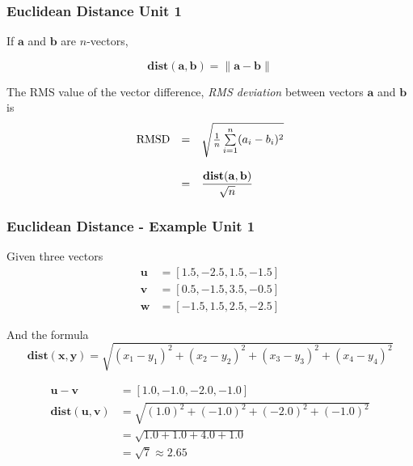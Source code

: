 \documentclass[12pt]{beamer}
\newcommand{\FrameTitle}[2]{\frametitle{#1 \hfill \small\textnormal{\textcolor{midgray}{#2}}}}
\newcommand{\MVec}[1]{\mathbf{#1}}
\newcommand{\Norm}[1]{\lVert {\mathbf{#1}} \rVert}
\begin{document}
\begin{frame}\FrameTitle{Euclidean Distance}{Unit 1}
    If $\MVec{a}$ and $\MVec{b}$ are $n$-vectors,

    \[
        {\mathbf{dist}}(\MVec{a}, \MVec{b}) = \Norm{\MVec{a} - \MVec{b}}
    \]

    \vspace*{1em}
    The RMS value of the vector difference,
    \emph{RMS deviation} between vectors $\MVec{a}$ and $\MVec{b}$ is
    \[
        \begin{array}{rll}
            \textrm{RMSD} & = & \sqrt{\frac{1}{n}\sum\limits_{i=1}^{n}(a_{i}-b_{i})^{2}} \vspace*{12pt}\\
                 & = & \dfrac{\mathbf{dist}(\MVec{a}, \MVec{b})}{\sqrt{n}}
        \end{array}
    \]
\end{frame}

\begin{frame}\FrameTitle{Euclidean Distance - Example}{Unit 1}
    Given three vectors
    \begin{align*}
    \MVec{u} &= [1.5, -2.5, 1.5, -1.5] \\
    \MVec{v} &= [0.5, -1.5, 3.5, -0.5] \\
    \MVec{w} &= [-1.5, 1.5, 2.5, -2.5]
    \end{align*}

    And the formula
    \[
        \mathbf{dist}(\MVec{x}, \MVec{y}) = \sqrt{(x_1 - y_1)^2 + (x_2 - y_2)^2 + (x_3 - y_3)^2 + (x_4 - y_4)^2}
    \]

    \begin{align*}
        \MVec{u} - \MVec{v} &= [1.0, -1.0, -2.0, -1.0] \\
        \mathbf{dist}(\MVec{u}, \MVec{v}) &= \sqrt{(1.0)^2 + (-1.0)^2 + (-2.0)^2 + (-1.0)^2} \\
                                          &= \sqrt{1.0 + 1.0 + 4.0 + 1.0} \\
                                          &= \sqrt{7} \approx 2.65
    \end{align*}
\end{frame}
\end{document}
